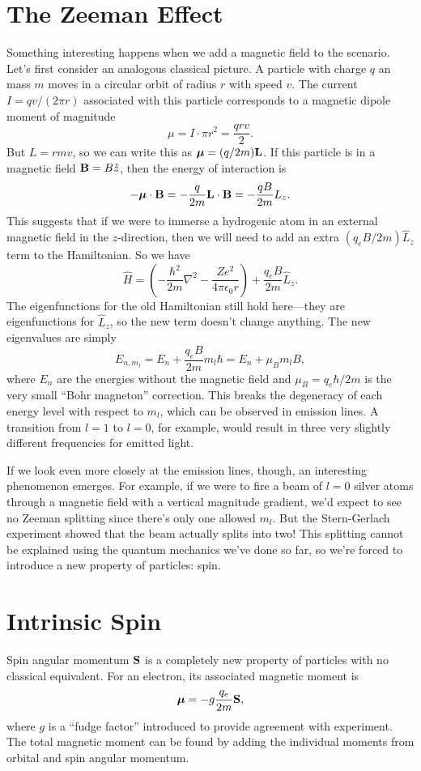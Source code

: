 \documentclass[../p052main.tex]{subfiles}
\begin{document}
\section{The Zeeman Effect}
Something interesting happens when we add a magnetic field to the scenario.
Let's first consider an analogous classical picture.
A particle with charge $q$ an mass $m$ moves in a circular orbit of radius $r$ with speed $v$.
The current $I = qv / (2\pi r)$ associated with this particle corresponds to a magnetic dipole moment of magnitude
\[ \mu = I \cdot \pi r^2 = \frac{qrv}{2}. \]
But $L = rmv$, so we can write this as $\boldsymbol\mu = (q / 2m) \mathbf{L}$.
If this particle is in a magnetic field $\mathbf{B} = B \hat z$, then the energy of interaction is
\[ -\boldsymbol\mu \cdot \mathbf{B} = -\frac{q}{2m} \mathbf{L} \cdot \mathbf{B} = -\frac{qB}{2m}L_z. \]
This suggests that if we were to immerse a hydrogenic atom in an external magnetic field in the $z$-direction, then we will need to add an extra $(q_e B / 2m) \hat L_z$ term to the Hamiltonian.
So we have
\[ \hat H = \left( -\frac{\hbar^2}{2m} \nabla^2 - \frac{Ze^2}{4\pi \epsilon_0 r} \right) + \frac{q_e B}{2m} \hat L_z. \]
The eigenfunctions for the old Hamiltonian still hold here---they are eigenfunctions for $\hat L_z$, so the new term doesn't change anything.
The new eigenvalues are simply
\[ E_{n,m_l} = E_n + \frac{q_e B}{2m} m_l \hbar = E_n + \mu_B m_l B, \]
where $E_n$ are the energies without the magnetic field and $\mu_B = q_e \hbar / 2m$ is the very small ``Bohr magneton'' correction.
This breaks the degeneracy of each energy level with respect to $m_l$, which can be observed in emission lines.
A transition from $l=1$ to $l=0$, for example, would result in three very slightly different frequencies for emitted light.

If we look even more closely at the emission lines, though, an interesting phenomenon emerges.
For example, if we were to fire a beam of $l=0$ silver atoms through a magnetic field with a vertical magnitude gradient, we'd expect to see no Zeeman splitting since there's only one allowed $m_l$.
But the Stern-Gerlach experiment showed that the beam actually splits into two!
This splitting cannot be explained using the quantum mechanics we've done so far, so we're forced to introduce a new property of particles: spin.

\section{Intrinsic Spin}
Spin angular momentum $\mathbf{S}$ is a completely new property of particles with no classical equivalent.
For an electron, its associated magnetic moment is
\[ \boldsymbol\mu = -g \frac{q_e}{2m} \mathbf{S}, \]
where $g$ is a ``fudge factor'' introduced to provide agreement with experiment.
The total magnetic moment can be found by adding the individual moments from orbital and spin angular momentum.
\end{document}
